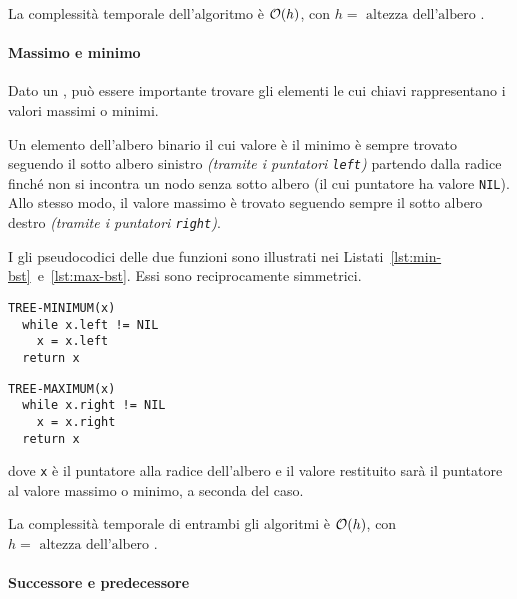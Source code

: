 \documentclass[italian, 10pt]{article}
\begin{document}
\bigskip
La complessità temporale dell'algoritmo è \(\mathcal{O}(h)\), con \(h = \text{ altezza dell'albero }\).

\paragraph{Massimo e minimo}
\label{par:massimo-minimo-bst}

Dato un \BST, può essere importante trovare gli elementi le cui chiavi rappresentano i valori massimi o minimi.

Un elemento dell'albero binario il cui valore è il minimo è sempre trovato seguendo il sotto albero sinistro \textit{(tramite i puntatori \texttt{left})} partendo dalla radice finché non si incontra un nodo senza sotto albero (il cui puntatore ha valore \texttt{NIL}).
Allo stesso modo, il valore massimo è trovato seguendo sempre il sotto albero destro \textit{(tramite i puntatori \texttt{right})}.

I gli pseudocodici delle due funzioni sono illustrati nei Listati~\ref{lst:min-bst}~e~\ref{lst:max-bst}.
Essi sono reciprocamente simmetrici.

\begin{minipage}[t]{0.495\textwidth}
  \begin{lstlisting}[style=pseudocode, caption={Minimo di un BST}, label={lst:min-bst}]
TREE-MINIMUM(x)
  while x.left != NIL
    x = x.left
  return x
  \end{lstlisting}
\end{minipage}
\begin{minipage}[t]{0.495\textwidth}
  \begin{lstlisting}[style=pseudocode, caption={Massimo di un BST}, label={lst:max-bst}]
TREE-MAXIMUM(x)
  while x.right != NIL
    x = x.right
  return x
  \end{lstlisting}
\end{minipage}

dove \texttt{x} è il puntatore alla radice dell'albero e il valore restituito sarà il puntatore al valore massimo o minimo, a seconda del caso.

\bigskip
La complessità temporale di entrambi gli algoritmi è \(\mathcal{O}(h)\), con \(h = \text{ altezza dell'albero }\).

\paragraph{Successore e predecessore}
\label{par:successore-predecessore-bst}
\end{document}
